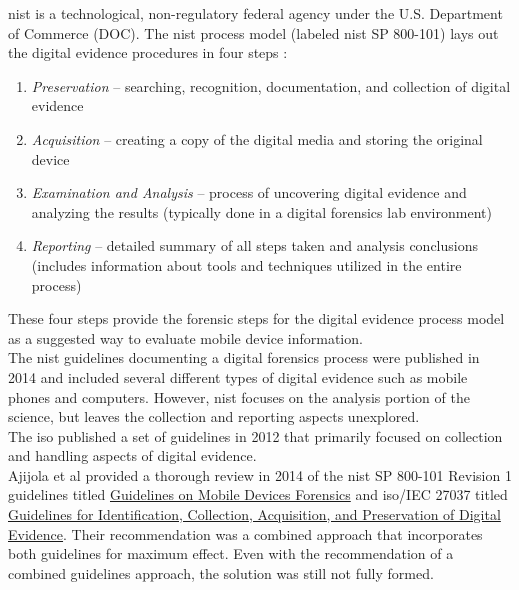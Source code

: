 \documentclass[12pt]{article}
\begin{document}
\gls{nist} is a technological, non-regulatory
federal agency under the U.S. Department of Commerce (DOC).  The \gls{nist} process model (labeled \gls{nist}
SP 800-101) lays out the digital evidence procedures in four steps \cite{ajijola2014review}:

\begin{enumerate}
  \item {\em Preservation} -- searching, recognition, documentation, and collection of digital evidence
  \item {\em Acquisition} -- creating a copy of the digital media and storing the original device
  \item {\em Examination and Analysis} -- process of uncovering digital evidence and analyzing the results
  (typically done in a digital forensics lab environment)
  \item {\em Reporting} -- detailed summary of all steps taken and analysis conclusions
  (includes information about tools and techniques utilized in the entire process)
\end{enumerate}

These four steps provide the
forensic steps for the digital evidence process model as a suggested way to evaluate mobile
device information.\\

The \gls{nist} guidelines \cite{ayers2014guidelines} documenting a digital forensics process were published
in 2014 and included several different types of digital evidence such as mobile phones and computers.
However, \gls{nist} focuses on the analysis portion of the science, but leaves the collection
and reporting aspects unexplored.\\

The \gls{iso} published a set of guidelines \cite{ISO27037}
in 2012 that primarily focused on collection and handling aspects of digital evidence.\\

Ajijola et al provided a thorough review in 2014 \cite{ajijola2014review} of the \gls{nist} SP
800-101 Revision 1 guidelines titled \uline{Guidelines on Mobile Devices Forensics} and
\gls{iso}/IEC 27037 titled \uline{Guidelines for Identification, Collection, Acquisition, and
Preservation of Digital Evidence}.  Their recommendation was a combined approach that 
incorporates both guidelines for maximum effect.  Even with the recommendation of a 
combined guidelines approach, the solution was still not fully formed.\\
\end{document}
